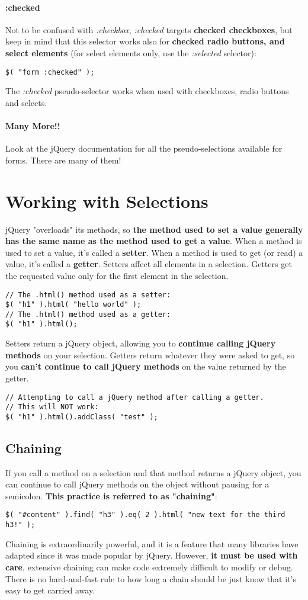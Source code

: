 \documentclass[10pt,letterpaper]{report}
\begin{document}
\paragraph{:checked}
Not to be confused with \textit{:checkbox}, \textit{:checked} targets \textbf{checked checkboxes}, but keep in mind that this selector works also for \textbf{checked radio buttons, and select elements} (for select elements only, use the \textit{:selected} selector):
\begin{lstlisting}
$( "form :checked" );
\end{lstlisting}
The \textit{:checked} pseudo-selector works when used with checkboxes, radio buttons and selects.
\paragraph{Many More!!}
Look at the jQuery documentation for all the pseudo-selections available for forms. There are many of them!

\section{Working with Selections}
jQuery "overloads" its methods, so \textbf{the method used to set a value generally has the same name as the method used to get a value}. When a method is used to set a value, it's called a \textbf{setter}. When a method is used to get (or read) a value, it's called a \textbf{getter}. Setters affect all elements in a selection. Getters get the requested value only for the first element in the selection.
\begin{lstlisting}
// The .html() method used as a setter:
$( "h1" ).html( "hello world" );
// The .html() method used as a getter:
$( "h1" ).html();
\end{lstlisting}
Setters return a jQuery object, allowing you to \textbf{continue calling jQuery methods} on your selection. Getters return whatever they were asked to get, so you \textbf{can't continue to call jQuery methods} on the value returned by the getter.
\begin{lstlisting}
// Attempting to call a jQuery method after calling a getter.
// This will NOT work:
$( "h1" ).html().addClass( "test" );
\end{lstlisting}

\subsection{Chaining}
If you call a method on a selection and that method returns a jQuery object, you can continue to call jQuery methods on the object without pausing for a semicolon. \textbf{This practice is referred to as "chaining"}:
\begin{lstlisting}
$( "#content" ).find( "h3" ).eq( 2 ).html( "new text for the third h3!" );
\end{lstlisting}
Chaining is extraordinarily powerful, and it is a feature that many libraries have adapted since it was made popular by jQuery. However, \textbf{it must be used with care}, extensive chaining can make code extremely difficult to modify or debug. There is no hard-and-fast rule to how long a chain should be just know that it's easy to get carried away.
\end{document}
